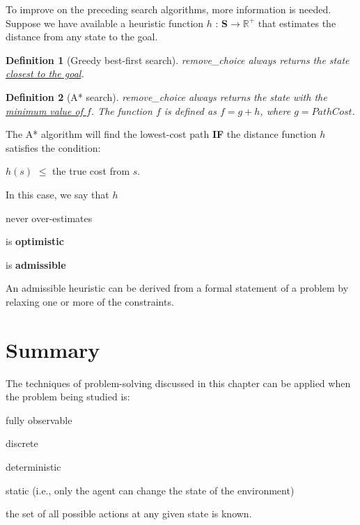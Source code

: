 \documentclass[10pt,a4paper]{article}
\newtheorem{defin}{Definition}
\newenvironment{itemize_packed}{
\begin{itemize}
\setlength{\itemsep}{0pt}
\setlength{\parskip}{0pt}
}{\end{itemize}}
\begin{document}
To improve on the preceding search algorithms, more information is needed. Suppose we have available a heuristic function $h$ : \textbf{S}$\rightarrow\mathbb{R}^+$ that estimates the distance from any state to the goal.

\begin{defin}[Greedy best-first search]
\emph{remove\_choice} always returns the state \underline{closest to the goal}.
\end{defin}

\begin{defin}[A* search]
\emph{remove\_choice} always returns the state with the \underline{minimum value of $f$}. The function $f$ is defined as $f = g + h$, where $g = PathCost$.
\end{defin}

The A* algorithm will find the lowest-cost path \textbf{IF} the distance function $h$ satisfies the condition:
\begin{center}
$h(s)$ $\leq$ the true cost from $s$.
\end{center}
In this case, we say that $h$
\begin{itemize_packed}
\item never over-estimates
\item is \textbf{optimistic}
\item is \textbf{admissible}
\end{itemize_packed}

An admissible heuristic can be derived from a formal statement of a problem by relaxing one or more of the constraints.

\section{Summary} %

The techniques of problem-solving discussed in this chapter can be applied when the problem being studied is:
\begin{itemize_packed}
\item fully observable
\item discrete
\item deterministic
\item static (i.e., only the agent can change the state of the environment)
\item the set of all possible actions at any given state is known.
\end{itemize_packed}
\end{document}

